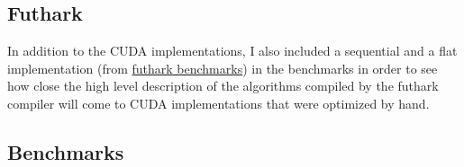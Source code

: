 \documentclass[a4paper,oneside]{memoir}
\begin{document}
\subsection{Futhark}
In addition to the CUDA implementations, I also included a sequential and a flat implementation (from \href{https://github.com/diku-dk/futhark-benchmarks/blob/bf5112d0841866dc7370586f2e2a7b48467d2d97/finpar/LocVolCalib.fut}{futhark benchmarks}) in the benchmarks in order to see how close the high level description of the algorithms compiled by the futhark compiler will come to CUDA implementations that were optimized by hand.

\subsection{Benchmarks}

\vspace*{\fill}
\end{document}
